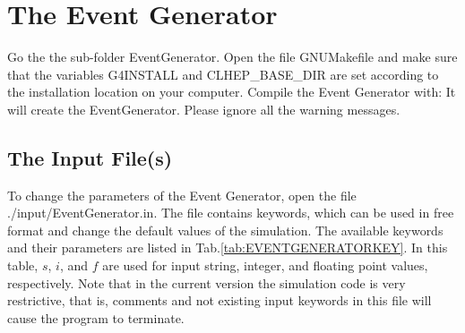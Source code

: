\documentclass[12pt]{book}
\begin{document}
\chapter{The Event Generator}

Go the the sub-folder {\ttfamily EventGenerator}.
Open the file {\ttfamily GNUMakefile} and make sure that the variables {\ttfamily G4INSTALL}
and {\ttfamily CLHEP\_BASE\_DIR} are set according to the installation location on your computer.
Compile the Event Generator with:\hfill{}
\linebreak
{}
\linebreak
\linebreak
It will create the EventGenerator. Please ignore all the warning messages.

\section{The Input File(s)}

To change the parameters of the Event Generator, open the file 
{\ttfamily ./input/EventGenerator.in}. The file contains keywords, which can be used
in free format and change the default values of the simulation. The available keywords and their
parameters are listed in Tab.\ref{tab:EVENTGENERATORKEY}. In this table, $s$, $i$, and $f$ are used
for input string, integer, and floating point values, respectively. Note that in the current version
the simulation code is very restrictive, that is, comments and not existing input keywords in this file
will cause the program to terminate.
\end{document}
